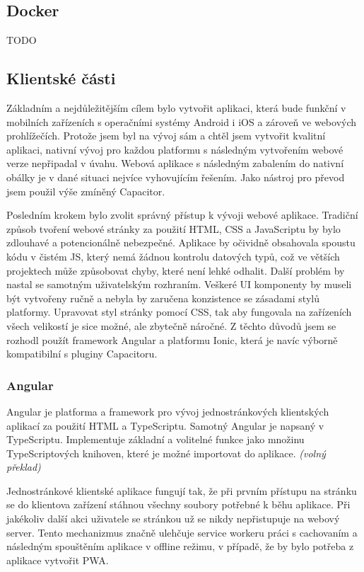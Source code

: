 \documentclass[
  biblatex,
  glossaries,
  index
]{kidiplom}
\begin{document}
\subsection{Docker}
TODO
 
\subsection{Klientské části}
Základním a nejdůležitějším cílem bylo vytvořit aplikaci, která bude funkční v mobilních zařízeních s operačními systémy Android i iOS a zároveň ve webových prohlížečích. Protože jsem byl na vývoj sám a chtěl jsem vytvořit kvalitní aplikaci, nativní vývoj pro každou platformu s následným vytvořením webové verze nepřipadal v úvahu. Webová aplikace s následným zabalením do nativní obálky je v dané situaci nejvíce vyhovujícím řešením. Jako nástroj pro převod jsem použil výše zmíněný Capacitor. 

Posledním krokem bylo zvolit správný přístup k vývoji webové aplikace. Tradiční způsob tvoření webové stránky za použití HTML, CSS a JavaScriptu by bylo zdlouhavé a potencionálně nebezpečné. Aplikace by očividně obsahovala spoustu kódu v čistém JS, který nemá žádnou kontrolu datových typů, což ve větších projektech může způsobovat chyby, které není lehké odhalit. Další problém by nastal se samotným uživatelským rozhraním. Veškeré UI komponenty by museli být vytvořeny ručně a nebyla by zaručena konzistence se zásadami stylů platformy. Upravovat styl stránky pomocí CSS, tak aby fungovala na zařízeních všech velikostí je sice možné, ale zbytečně náročné. Z těchto důvodů jsem se rozhodl použít framework Angular a platformu Ionic, která je navíc výborně kompatibilní s pluginy Capacitoru.

\subsubsection{Angular}
Angular je platforma a framework pro vývoj jednostránkových klientských aplikací za použití HTML a TypeScriptu. Samotný Angular je napsaný v TypeScriptu. Implementuje základní a volitelné funkce jako množinu TypeScriptových knihoven, které je možné importovat do aplikace. \cite{8} \textit{(volný překlad)} 

Jednostránkové klientské aplikace fungují tak, že při prvním přístupu na stránku se do klientova zařízení stáhnou všechny soubory potřebné k běhu aplikace. Při jakékoliv další akci uživatele se stránkou už se nikdy nepřistupuje na webový server. Tento mechanizmus značně ulehčuje service workeru práci s cachovaním a následným spouštěním aplikace v offline režimu, v případě, že by bylo potřeba z aplikace vytvořit PWA.
\end{document}
